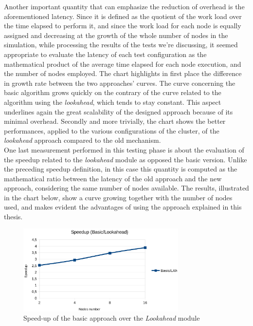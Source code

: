 \documentclass[12pt,a4paper,fleqn]{report}
\begin{document}
Another important quantity that can emphasize the reduction of overhead is the aforementioned latency. Since it is defined as the quotient of the work load over the time elapsed to perform it, and since the work load for each node is equally assigned and decreasing at the growth of the whole number of nodes in the simulation, while processing the results of the tests we're discussing, it seemed appropriate to evaluate the latency of each test configuration as the mathematical product of the average time elapsed for each node execution, and the number of nodes employed. The chart highlights in first place the difference in growth rate between the two approaches' curves. The curve concerning the basic algorithm grows quickly on the contrary of the curve related to the algorithm using the \textit{lookahead}, which tends to stay constant. This aspect underlines again the great scalability of the designed approach because of its minimal overhead. Secondly and more trivially, the chart shows the better performances, applied to the various configurations of the cluster, of the \textit{lookahead} approach compared to the old mechanism. \\

One last measurement performed in this testing phase is about the evaluation of the speedup related to the \textit{lookahead} module as opposed the basic version. Unlike the preceding speedup definition, in this case this quantity is computed as the mathematical ratio between the latency of the old approach and the new approach, considering the same number of nodes available. The results, illustrated in the chart below, show a curve growing together with the number of nodes used, and makes evident the advantages of using the approach explained in this thesis.

 \begin{figure}[ht!]
\label{chart3}
\centering
	\vspace{13pt}
    \includegraphics[trim=0mm 10mm 0mm 10mm, width=0.75\textwidth]{speedup_two}
    \caption{Speed-up of the basic approach over the \textit{Lookahead} module}
\end{figure}
\end{document}
